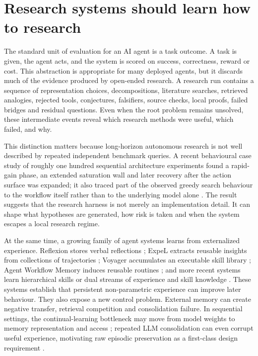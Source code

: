 \section{Research systems should learn how to research}

The standard unit of evaluation for an AI agent is a task outcome. A task is given, the agent acts, and the system is scored on success, correctness, reward or cost. This abstraction is appropriate for many deployed agents, but it discards much of the evidence produced by open-ended research. A research run contains a sequence of representation choices, decompositions, literature searches, retrieved analogies, rejected tools, conjectures, falsifiers, source checks, local proofs, failed bridges and residual questions. Even when the root problem remains unsolved, these intermediate events reveal which research methods were useful, which failed, and why.

This distinction matters because long-horizon autonomous research is not well described by repeated independent benchmark queries. A recent behavioural case study of roughly one hundred sequential architecture experiments found a rapid-gain phase, an extended saturation wall and later recovery after the action surface was expanded; it also traced part of the observed greedy search behaviour to the workflow itself rather than to the underlying model alone \cite{safdar2026longhorizon}. The result suggests that the research harness is not merely an implementation detail. It can shape what hypotheses are generated, how risk is taken and when the system escapes a local research regime.

At the same time, a growing family of agent systems learns from externalized experience. Reflexion stores verbal reflections \cite{shinn2023reflexion}; ExpeL extracts reusable insights from collections of trajectories \cite{zhao2023expel}; Voyager accumulates an executable skill library \cite{wang2023voyager}; Agent Workflow Memory induces reusable routines \cite{wang2024awm}; and more recent systems learn hierarchical skills or dual streams of experience and skill knowledge \cite{wang2026autoskills,jiang2026xskill}. These systems establish that persistent non-parametric experience can improve later behaviour. They also expose a new control problem. External memory can create negative transfer, retrieval competition and consolidation failure. In sequential settings, the continual-learning bottleneck may move from model weights to memory representation and access \cite{hu2026memory}; repeated LLM consolidation can even corrupt useful experience, motivating raw episodic preservation as a first-class design requirement \cite{zhang2026faultymemory}.

